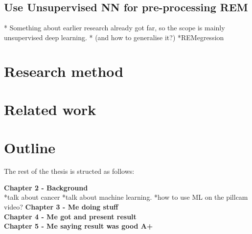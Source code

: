 		\subsection{Use Unsupervised NN for pre-processing REM}
		* Something about earlier research already got far, so the scope is mainly unsupervised deep learning.
		* (and how to generalise it?)
*REMegression	
		

	\section{Research method}
	\section{Related work}
	\section{Outline}
	The rest of the thesis is structed as follows:
	
	\textbf{Chapter 2 - Background}\\
	*talk about cancer
	*talk about machine learning.
	*how to use ML on the pillcam video?
	\textbf{Chapter 3 - Me doing stuff}\\
	\textbf{Chapter 4 - Me got and present result}\\
	\textbf{Chapter 5 - Me saying result was good A+}\\
